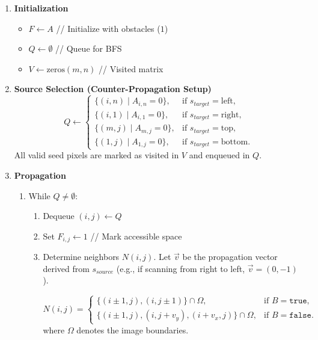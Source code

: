 \documentclass[a4paper,fleqn]{cas-dc}
\begin{document}
\begin{enumerate}
    \item \textbf{Initialization}
    \begin{itemize}
        \item $F \leftarrow A$ \hfill // Initialize with obstacles ($1$)
        \item $Q \leftarrow \emptyset$ \hfill // Queue for BFS
        \item $V \leftarrow \text{zeros}(m, n)$ \hfill // Visited matrix
    \end{itemize}

    \item \textbf{Source Selection (Counter-Propagation Setup)}
    \begin{equation}
        Q \leftarrow \begin{cases}
            \{ (i,n) \mid A_{i,n} = 0 \}, & \text{if } s_{target} = \text{left}, \\
            \{ (i,1) \mid A_{i,1} = 0 \}, & \text{if } s_{target} = \text{right}, \\
            \{ (m,j) \mid A_{m,j} = 0 \}, & \text{if } s_{target} = \text{top}, \\
            \{ (1,j) \mid A_{1,j} = 0 \}, & \text{if } s_{target} = \text{bottom}.
        \end{cases}
    \end{equation}
    All valid seed pixels are marked as visited in $V$ and enqueued in $Q$.

    \item \textbf{Propagation}
    \begin{enumerate}
        \item While $Q \neq \emptyset$:
        \begin{enumerate}
            \item Dequeue $(i,j) \leftarrow Q$
            \item Set $F_{i,j} \leftarrow 1$ \hfill // Mark accessible space
            
            \item Determine neighbors $N(i,j)$. Let $\vec{v}$ be the propagation vector derived from $s_{source}$ (e.g., if scanning from right to left, $\vec{v}=(0, -1)$).
            
            \begin{equation}
                N(i,j) = \begin{cases}
                    \{(i \pm 1, j), (i, j \pm 1)\} \cap \Omega, & \text{if } B = \texttt{true}, \\
                    \{(i \pm 1, j), (i, j + v_y), (i + v_x, j)\} \cap \Omega, & \text{if } B = \texttt{false}.
                \end{cases}
            \end{equation}
            where $\Omega$ denotes the image boundaries.
            

\end{enumerate}
\end{enumerate}
\end{enumerate}
\end{document}
